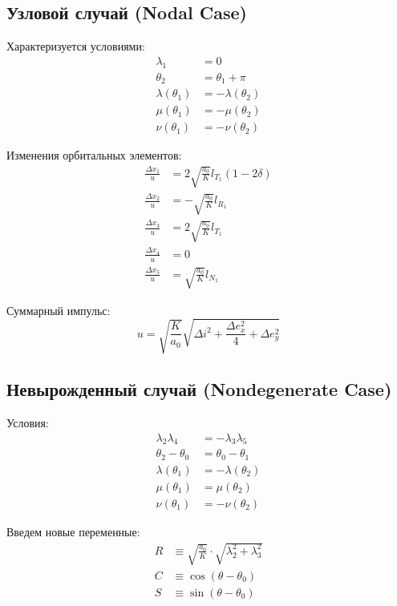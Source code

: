 \documentclass[12pt]{article}
\begin{document}
\subsection{Узловой случай (Nodal Case)}

Характеризуется условиями:
\begin{align}
\lambda_1 &= 0 \tag{15} \\
\theta_2 &= \theta_1 + \pi \tag{16} \\
\lambda(\theta_1) &= -\lambda(\theta_2) \\
\mu(\theta_1) &= -\mu(\theta_2) \\
\nu(\theta_1) &= -\nu(\theta_2) \tag{17}
\end{align}

Изменения орбитальных элементов:
\begin{align}
\frac{\Delta x_1}{u} &= 2\sqrt{\frac{a_0}{K}}l_{T_1}(1-2\delta) \tag{32} \\
\frac{\Delta x_2}{u} &= -\sqrt{\frac{a_0}{K}}l_{R_1} \tag{33} \\
\frac{\Delta x_3}{u} &= 2\sqrt{\frac{a_0}{K}}l_{T_1} \tag{34} \\
\frac{\Delta x_4}{u} &= 0 \tag{35} \\
\frac{\Delta x_5}{u} &= \sqrt{\frac{a_0}{K}}l_{N_1} \tag{36}
\end{align}

Суммарный импульс:
\begin{equation}
u = \sqrt{\frac{K}{a_0}}\sqrt{\Delta i^2 + \frac{\Delta e_x^2}{4} + \Delta e_y^2} \tag{37}
\end{equation}

\subsection{Невырожденный случай (Nondegenerate Case)}

Условия:
\begin{align}
\lambda_2\lambda_4 &= -\lambda_3\lambda_5 \tag{18} \\
\theta_2 - \theta_0 &= \theta_0 - \theta_1 \tag{19} \\
\lambda(\theta_1) &= -\lambda(\theta_2) \\
\mu(\theta_1) &= \mu(\theta_2) \\
\nu(\theta_1) &= -\nu(\theta_2) \tag{20}
\end{align}

Введем новые переменные:
\begin{align}
R &\equiv \sqrt{\frac{a_0}{K}}\cdot\sqrt{\lambda_2^2 + \lambda_3^2} \tag{50} \\
C &\equiv \cos(\theta - \theta_0) \\
S &\equiv \sin(\theta - \theta_0)
\end{align}
\end{document}
